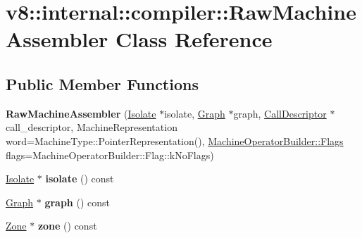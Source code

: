 \hypertarget{classv8_1_1internal_1_1compiler_1_1_raw_machine_assembler}{}\section{v8\+:\+:internal\+:\+:compiler\+:\+:Raw\+Machine\+Assembler Class Reference}
\label{classv8_1_1internal_1_1compiler_1_1_raw_machine_assembler}
\subsection*{Public Member Functions}
\begin{DoxyCompactItemize}
\item 
{\bfseries Raw\+Machine\+Assembler} (\hyperlink{classv8_1_1internal_1_1_isolate}{Isolate} $\ast$isolate, \hyperlink{classv8_1_1internal_1_1compiler_1_1_graph}{Graph} $\ast$graph, \hyperlink{classv8_1_1internal_1_1compiler_1_1_call_descriptor}{Call\+Descriptor} $\ast$call\+\_\+descriptor, Machine\+Representation word=Machine\+Type\+::\+Pointer\+Representation(), \hyperlink{classv8_1_1base_1_1_flags}{Machine\+Operator\+Builder\+::\+Flags} flags=Machine\+Operator\+Builder\+::\+Flag\+::k\+No\+Flags)\hypertarget{classv8_1_1internal_1_1compiler_1_1_raw_machine_assembler_ab44786716a7b0fd80b075f414281bedb}{}\label{classv8_1_1internal_1_1compiler_1_1_raw_machine_assembler_ab44786716a7b0fd80b075f414281bedb}

\item 
\hyperlink{classv8_1_1internal_1_1_isolate}{Isolate} $\ast$ {\bfseries isolate} () const \hypertarget{classv8_1_1internal_1_1compiler_1_1_raw_machine_assembler_a25ce5aac2368f363d7249e0efd8416a2}{}\label{classv8_1_1internal_1_1compiler_1_1_raw_machine_assembler_a25ce5aac2368f363d7249e0efd8416a2}

\item 
\hyperlink{classv8_1_1internal_1_1compiler_1_1_graph}{Graph} $\ast$ {\bfseries graph} () const \hypertarget{classv8_1_1internal_1_1compiler_1_1_raw_machine_assembler_a7eba0db185ecf674e3f0daa1c7d26508}{}\label{classv8_1_1internal_1_1compiler_1_1_raw_machine_assembler_a7eba0db185ecf674e3f0daa1c7d26508}

\item 
\hyperlink{classv8_1_1internal_1_1_zone}{Zone} $\ast$ {\bfseries zone} () const \hypertarget{classv8_1_1internal_1_1compiler_1_1_raw_machine_assembler_a2b726305fe98978d12dc9ff02a5d857a}{}\label{classv8_1_1internal_1_1compiler_1_1_raw_machine_assembler_a2b726305fe98978d12dc9ff02a5d857a}


\end{DoxyCompactItemize}
